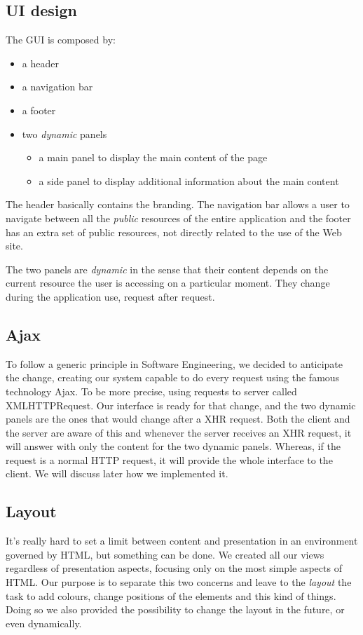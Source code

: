 \documentclass[12pt]{report}
\begin{document}
\subsection{UI design}
The GUI is composed by:
\begin{itemize}
\item a header
\item a navigation bar
\item a footer
\item two \emph{dynamic} panels
	\begin{itemize}
	\item a main panel to display the main content of the page
    \item a side panel to display additional information about the main content
	\end{itemize}
\end{itemize}
The header basically contains the branding. The navigation bar allows a user to navigate between all the \emph{public} resources of the entire application and the footer has an extra set of public resources, not directly related to the use of the Web site.

The two panels are \emph{dynamic} in the sense that their content depends on the current resource the user is accessing on a particular moment. They change during the application use, request after request.

\subsection{Ajax}
To follow a generic principle in Software Engineering, we decided to anticipate the change, creating our system capable to do every request using the famous technology Ajax. To be more precise, using requests to server called XMLHTTPRequest. Our interface is ready for that change, and the two dynamic panels are the ones that would change after a XHR request. Both the client and the server are aware of this and whenever the server receives an XHR request, it will answer with only the content for the two dynamic panels. Whereas, if the request is a normal HTTP request, it will provide the whole interface to the client. We will discuss later how we implemented it.

\subsection{Layout}
It's really hard to set a limit between content and presentation in an environment governed by HTML, but something can be done. We created all our views regardless of presentation aspects, focusing only on the most simple aspects of HTML. Our purpose is to separate this two concerns and leave to the \emph{layout} the task to add colours, change positions of the elements and this kind of things. Doing so we also provided the possibility to change the layout in the future, or even dynamically.
\end{document}
